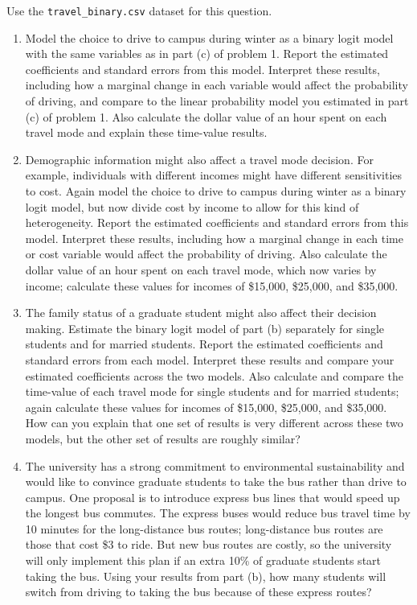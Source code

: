 \documentclass[11pt,letterpaper]{article}
\begin{document}
Use the \texttt{travel\_binary.csv} dataset for this question.

\begin{enumerate}[label=\alph*., leftmargin=*]
	\item Model the choice to drive to campus during winter as a binary logit model with the same variables as in part (c) of problem 1. Report the estimated coefficients and standard errors from this model. Interpret these results, including how a marginal change in each variable would affect the probability of driving, and compare to the linear probability model you estimated in part (c) of problem 1. Also calculate the dollar value of an hour spent on each travel mode and explain these time-value results.

	\item Demographic information might also affect a travel mode decision. For example, individuals with different incomes might have different sensitivities to cost. Again model the choice to drive to campus during winter as a binary logit model, but now divide cost by income to allow for this kind of heterogeneity. Report the estimated coefficients and standard errors from this model. Interpret these results, including how a marginal change in each time or cost variable would affect the probability of driving. Also calculate the dollar value of an hour spent on each travel mode, which now varies by income; calculate these values for incomes of \$15,000, \$25,000, and \$35,000.
	
	\item The family status of a graduate student might also affect their decision making. Estimate the binary logit model of part (b) separately for single students and for married students. Report the estimated coefficients and standard errors from each model. Interpret these results and compare your estimated coefficients across the two models. Also calculate and compare the time-value of each travel mode for single students and for married students; again calculate these values for incomes of \$15,000, \$25,000, and \$35,000. How can you explain that one set of results is very different across these two models, but the other set of results are roughly similar?
	
	\item The university has a strong commitment to environmental sustainability and would like to convince graduate students to take the bus rather than drive to campus. One proposal is to introduce express bus lines that would speed up the longest bus commutes. The express buses would reduce bus travel time by 10 minutes for the long-distance bus routes; long-distance bus routes are those that cost \$3 to ride. But new bus routes are costly, so the university will only implement this plan if an extra 10\% of graduate students start taking the bus. Using your results from part (b), how many students will switch from driving to taking the bus because of these express routes?
	

\end{enumerate}
\end{document}
